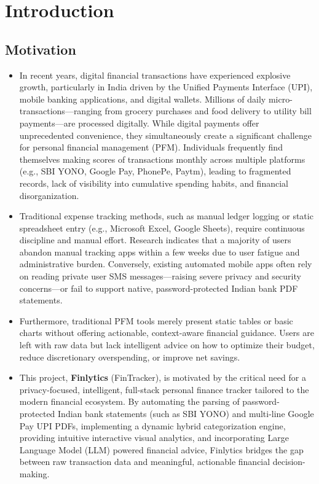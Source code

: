 \documentclass[../Project-Report-Main.tex]{subfiles}
\begin{document}
\chapter{Introduction}

\section{Motivation}

\begin{itemize}
 \item In recent years, digital financial transactions have experienced explosive growth, particularly in India driven by the Unified Payments Interface (UPI), mobile banking applications, and digital wallets. Millions of daily micro-transactions—ranging from grocery purchases and food delivery to utility bill payments—are processed digitally. While digital payments offer unprecedented convenience, they simultaneously create a significant challenge for personal financial management (PFM). Individuals frequently find themselves making scores of transactions monthly across multiple platforms (e.g., SBI YONO, Google Pay, PhonePe, Paytm), leading to fragmented records, lack of visibility into cumulative spending habits, and financial disorganization.

 \item Traditional expense tracking methods, such as manual ledger logging or static spreadsheet entry (e.g., Microsoft Excel, Google Sheets), require continuous discipline and manual effort. Research indicates that a majority of users abandon manual tracking apps within a few weeks due to user fatigue and administrative burden. Conversely, existing automated mobile apps often rely on reading private user SMS messages—raising severe privacy and security concerns—or fail to support native, password-protected Indian bank PDF statements.

 \item Furthermore, traditional PFM tools merely present static tables or basic charts without offering actionable, context-aware financial guidance. Users are left with raw data but lack intelligent advice on how to optimize their budget, reduce discretionary overspending, or improve net savings.

 \item This project, \textbf{Finlytics} (FinTracker), is motivated by the critical need for a privacy-focused, intelligent, full-stack personal finance tracker tailored to the modern financial ecosystem. By automating the parsing of password-protected Indian bank statements (such as SBI YONO) and multi-line Google Pay UPI PDFs, implementing a dynamic hybrid categorization engine, providing intuitive interactive visual analytics, and incorporating Large Language Model (LLM) powered financial advice, Finlytics bridges the gap between raw transaction data and meaningful, actionable financial decision-making.
\end{itemize}
\end{document}
